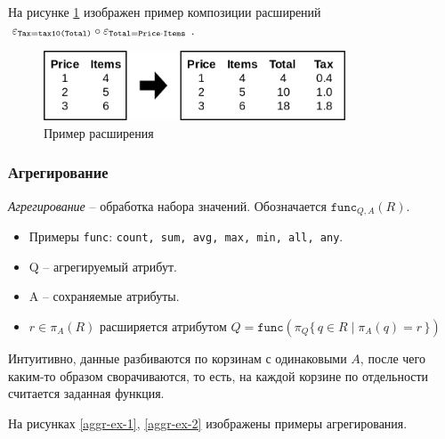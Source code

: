На рисунке \ref{extend-ex} изображен пример композиции расширений $\varepsilon_{\texttt{Tax}=\texttt{tax10(Total)}}
	\circ \varepsilon_{\texttt{Total}=\texttt{Price} \cdot \texttt{Items}}$.

\begin{figure}[H]
	\centering
	\includegraphics[width=0.8\textwidth]{../assets/kgeorgiy/relalgebra/Data_Extend_2.svg.png}
	\caption{Пример расширения}
	\label{extend-ex}
\end{figure}

\subsubsection{Агрегирование}

\begin{definition}
	\textit{Агрегирование} -- обработка набора значений. Обозначается $\texttt{func}_{Q,A}(R)$.
	\begin{itemize}
		\item Примеры \texttt{func}: \texttt{count, sum, avg, max, min, all, any}.
		\item Q -- агрегируемый атрибут.
		\item A -- сохраняемые атрибуты.
		\item $r \in \pi_A(R)$ расширяется атрибутом $Q = \texttt{func}(\pi_Q\{\,q \in R \mid \pi_A(q) = r\,\})$
	\end{itemize}
\end{definition}

\begin{remark}
	Интуитивно, данные разбиваются по корзинам с одинаковыми $A$, после чего
	каким-то образом сворачиваются,  то есть, на каждой корзине по отдельности считается заданная
	функция.
\end{remark}

На рисунках \ref{aggr-ex-1}, \ref{aggr-ex-2} изображены примеры агрегирования.

